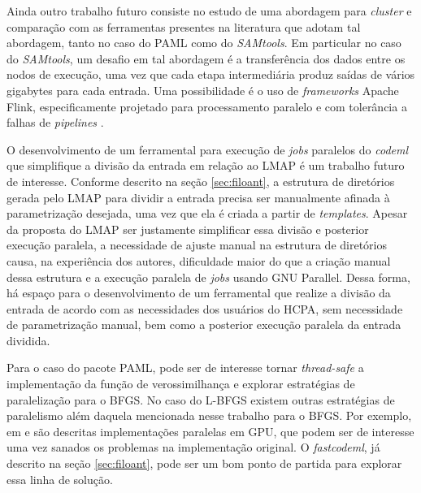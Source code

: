 \documentclass[cic,tc]{iiufrgs}
\begin{document}
Ainda outro trabalho futuro consiste no estudo de uma abordagem para
\textit{cluster} e comparação com as ferramentas presentes na literatura que
adotam tal abordagem, tanto no caso do PAML como do \textit{SAMtools}. Em particular no
caso do \textit{SAMtools}, um desafio em tal abordagem é a transferência dos dados entre
os nodos de execução, uma vez que cada etapa intermediária produz saídas de
vários gigabytes para cada entrada. Uma possibilidade é o uso de
\textit{frameworks} Apache Flink, especificamente projetado para processamento
paralelo e com tolerância a falhas de \textit{pipelines} \cite{carbone2015apache}.

O desenvolvimento de um ferramental para execução de \textit{jobs} paralelos do
\textit{codeml} que simplifique a divisão da entrada em relação ao LMAP é um trabalho
futuro de interesse. Conforme descrito na seção \ref{sec:filoant}, a estrutura
de diretórios gerada pelo LMAP para dividir a entrada precisa ser manualmente
afinada à parametrização desejada, uma vez que ela é criada a partir de
\textit{templates}. Apesar da proposta do LMAP ser justamente simplificar essa
divisão e posterior execução paralela, a necessidade de ajuste manual na
estrutura de diretórios causa, na experiência dos autores, dificuldade maior do
que a criação manual dessa estrutura e a execução paralela de \textit{jobs} usando GNU
Parallel. Dessa forma, há espaço para o desenvolvimento de um ferramental que
realize a divisão da entrada de acordo com as necessidades dos usuários do
HCPA, sem necessidade de parametrização manual, bem como a posterior execução
paralela da entrada dividida.

Para o caso do pacote PAML, pode ser de interesse tornar \textit{thread-safe} a
implementação da função de verossimilhança e explorar estratégias de
paralelização para o BFGS. No caso do L-BFGS existem outras estratégias de
paralelismo além daquela mencionada nesse trabalho para o BFGS. Por exemplo, em
\cite{fei2014parallel} e \cite{sanseverino2014cuda} são descritas
implementações paralelas em GPU, que podem ser de interesse uma vez sanados os
problemas na implementação original. O \textit{fastcodeml}, já descrito na seção
\ref{sec:filoant}, pode ser um bom ponto de partida para explorar essa linha de
solução.

%
%
%
%



\end{document}
